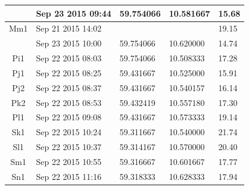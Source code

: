 \documentclass[12pt,a4paper,english]{article}
\begin{document}
\begin{table}[tb]
\begin{tabular}{|@{}c|l|l|l|l|}
    & Sep 23 2015 09:44 & 59.754066 & 10.581667 & 15.68\\ \hline
Mm1 & Sep 21 2015 14:02 &           &           & 19.15\\ 
    & Sep 23 2015 10:00 & 59.754066 & 10.620000 & 14.74\\ \hline
Pi1 & Sep 22 2015 08:03 & 59.754066 & 10.508333 & 17.28\\ \hline
Pj1 & Sep 22 2015 08:25 & 59.431667 & 10.525000 & 15.91\\ \hline
Pj2 & Sep 22 2015 08:37 & 59.431667 & 10.540157 & 16.14\\ \hline
Pk2 & Sep 22 2015 08:53 & 59.432419 & 10.557180 & 17.30\\ \hline
Pl1 & Sep 22 2015 09:08 & 59.431667 & 10.573333 & 19.14\\ \hline
Sk1 & Sep 22 2015 10:24 & 59.311667 & 10.540000 & 21.74\\ \hline
Sl1 & Sep 22 2015 10:37 & 59.314167 & 10.570000 & 20.40\\ \hline
Sm1 & Sep 22 2015 10:55 & 59.316667 & 10.601667 & 17.77\\ \hline
Sn1 & Sep 22 2015 11:16 & 59.318333 & 10.628333 & 17.94\\ \hline
\end{tabular}
\end{table}
\end{document}
